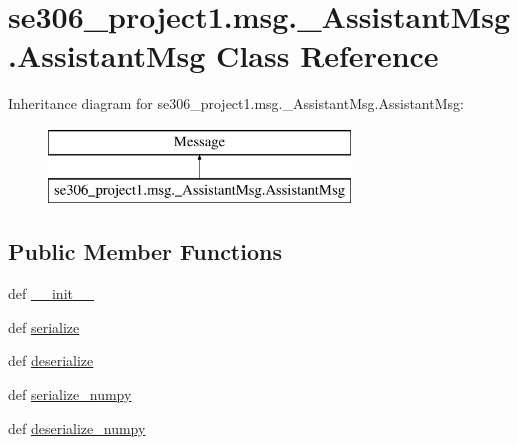 \hypertarget{classse306__project1_1_1msg_1_1__AssistantMsg_1_1AssistantMsg}{\section{se306\-\_\-project1.\-msg.\-\_\-\-Assistant\-Msg.\-Assistant\-Msg Class Reference}
\label{classse306__project1_1_1msg_1_1__AssistantMsg_1_1AssistantMsg}
}
Inheritance diagram for se306\-\_\-project1.\-msg.\-\_\-\-Assistant\-Msg.\-Assistant\-Msg\-:\begin{figure}[H]
\begin{center}
\leavevmode
\includegraphics[height=2.000000cm]{classse306__project1_1_1msg_1_1__AssistantMsg_1_1AssistantMsg}
\end{center}
\end{figure}
\subsection*{Public Member Functions}
\begin{DoxyCompactItemize}
\item 
def \hyperlink{classse306__project1_1_1msg_1_1__AssistantMsg_1_1AssistantMsg_a301e2c6ab7ed4c48405f23e0992ad767}{\-\_\-\-\_\-init\-\_\-\-\_\-}
\item 
def \hyperlink{classse306__project1_1_1msg_1_1__AssistantMsg_1_1AssistantMsg_a8c4b6d99e72713a71f12f87c18ee2e06}{serialize}
\item 
def \hyperlink{classse306__project1_1_1msg_1_1__AssistantMsg_1_1AssistantMsg_aa8700e1054cba903da6a3e14051c4c04}{deserialize}
\item 
def \hyperlink{classse306__project1_1_1msg_1_1__AssistantMsg_1_1AssistantMsg_a6018ce827cc44ec27b28ef5c65380cfd}{serialize\-\_\-numpy}
\item 
def \hyperlink{classse306__project1_1_1msg_1_1__AssistantMsg_1_1AssistantMsg_a1572c60a75384a707bf4200a39a0a295}{deserialize\-\_\-numpy}
\end{DoxyCompactItemize}
